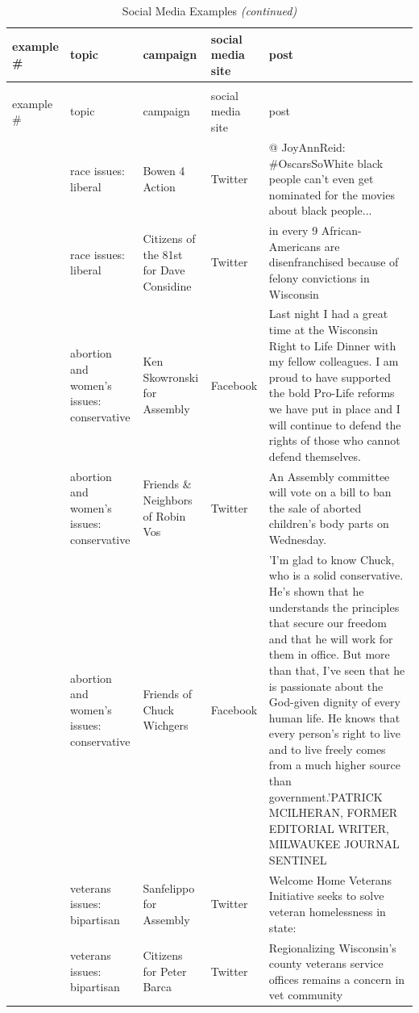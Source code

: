 \documentclass[12pt,]{article}
\begin{document}
\begin{longtable}[t]{>{\raggedright\arraybackslash}p{.65in}|>{\raggedright\arraybackslash}p{1in}|>{\raggedright\arraybackslash}p{1in}|>{\raggedright\arraybackslash}p{.7in}|>{\raggedright\arraybackslash}p{2.5in}}
\caption{\label{tab:unnamed-chunk-6}Social Media Examples}\\
\hline
example \# & topic & campaign & social media site & post\\
\hline
\endfirsthead
\caption[]{Social Media Examples \textit{(continued)}}\\
\hline
example \# & topic & campaign & social media site & post\\
\hline
\endhead
1 & race issues: liberal & Bowen 4 Action & Twitter & @ JoyAnnReid: \#OscarsSoWhite black people can't even get nominated for the movies about black people...\\
\hline
2 & race issues: liberal & Citizens of the 81st for Dave Considine & Twitter & 1 in every 9 African-Americans are disenfranchised because of felony convictions in Wisconsin\\
\hline
3 & abortion and women's issues: conservative & Ken Skowronski for Assembly & Facebook & Last night I had a great time at the Wisconsin Right to Life Dinner with my fellow colleagues. I am proud to have supported the bold Pro-Life reforms we have put in place and I will continue to defend the rights of those who cannot defend themselves.\\
\hline
4 & abortion and women's issues: conservative & Friends \& Neighbors of Robin Vos & Twitter & An Assembly committee will vote on a bill to ban the sale of aborted children's body parts on Wednesday.\\
\hline
5 & abortion and women's issues: conservative & Friends of Chuck Wichgers & Facebook & 'I'm glad to know Chuck, who is a solid conservative. He's shown that he understands the principles that secure our freedom and that he will work for them in office. But more than that, I've seen that he is passionate about the God-given dignity of every human life. He knows that every person's right to live and to live freely comes from a much higher source than government.'PATRICK MCILHERAN, FORMER EDITORIAL WRITER, MILWAUKEE JOURNAL SENTINEL\\
\hline
6 & veterans issues: bipartisan & Sanfelippo for Assembly & Twitter & Welcome Home Veterans Initiative seeks to solve veteran homelessness in state:\\
\hline
7 & veterans issues: bipartisan & Citizens for Peter Barca & Twitter & Regionalizing Wisconsin's county veterans service offices remains a concern in vet community\\

\end{longtable}
\end{document}
